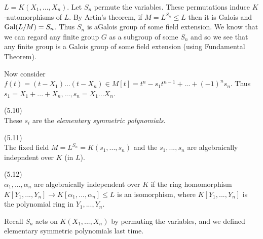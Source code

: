 \documentclass[a4paper]{article}
\begin{document}
\begin{eg}
$L = K(X_1,...,X_n)$. Let $S_n$ permute the variables. These permutations induce $K$-automorphisms of $L$. By Artin's theorem, if $M = L^{S_n} \leq L$ then it is Galois and $\operatorname{Gal}(L/M) = S_n$. Thus $S_n$ is aGalois group of some field extension. We know that we can regard any finite group $G$ as a subgroup of some $S_n$ and so we see that any finite group is a Galois group of some field extension (using Fundamental Theorem).

Now consider $f(t) = (t-X_1)...(t-X_n) \in M[t] = t^n - s_1 t^{n-1} + ... + (-1)^n s_n$. Thus $s_1 = X_1 + ... +X_n,...,s_n = X_1...X_n$.
\end{eg}

\begin{defi} (5.10)\\
These $s_i$ are the \emph{elementary symmetric polynomials}.
\end{defi}

\begin{thm} (5.11)\\
The fixed field $M=L^{S_n} = K(s_1,...,s_n)$ and the $s_1,...,s_n$ are algebraically indepndent over $K$ (in $L$).
\end{thm}

\begin{defi} (5.12)\\
$\alpha_1,...,\alpha_n$ are algebraically independent over $K$ if the ring homomorphism $K[Y_1,...,Y_n] \to K[\alpha_1,...,\alpha_n] \leq L$ is an isomorphism, where $K[Y_1,...,Y_n]$ is the polynomial ring in $Y_1,...,Y_n$.
\end{defi}

Recall $S_n$ acts on $K(X_1,...,X_n)$ by permuting the variables, and we defined elementary symmetric polynomials last time.
\end{document}
